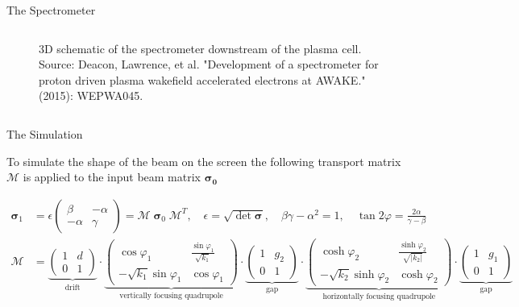 \documentclass[aspectratio=169]{beamer}
\begin{document}
\begin{frame}{The Spectrometer}
\begin{columns}
\begin{column}{0.5\linewidth}
\begin{figure}[h]
				\caption{
					3D schematic of the spectrometer downstream of the
					plasma cell. Source: Deacon, Lawrence, et al. "Development of a
					spectrometer for proton driven plasma wakefield accelerated
					electrons at AWAKE." (2015): WEPWA045.
				}
			\end{figure}
		\end{column}
	\end{columns}
\end{frame}

\small
\begin{frame}{The Simulation}

	To simulate the shape of the beam on the screen the following transport
	matrix $\mathcal{M}$ is applied to the input beam matrix $\bm{\sigma_0}$

	\begin{align*}
		\bm{\sigma}_1 &=
		\epsilon
		\begin{pmatrix}
			\beta & -\alpha \\
			-\alpha & \gamma
		\end{pmatrix} =
		\mathcal{M}\;\bm{\sigma}_0\;\mathcal{M}^T, \quad
		\epsilon = \sqrt{\det{\bm{\sigma}}}, \quad
		\beta\gamma-\alpha^2=1, \quad
		\tan2\varphi = \tfrac{2\alpha}{\gamma-\beta}
		\\[1em] %
		\mathcal{M} &= \underbrace{
		\begin{pmatrix}
			1 & d \\
			0 & 1
		\end{pmatrix}}_\text{drift}
		\cdot
		\underbrace{
		\begin{pmatrix}
			\cos\varphi_1 & \tfrac{\sin\varphi_1}{\sqrt{k_1}} \\
			-\sqrt{k_1}\sin\varphi_1 & \cos\varphi_1
		\end{pmatrix}}_\text{vertically focusing quadrupole}
		\cdot
		\underbrace{
		\begin{pmatrix}
			1 & g_2 \\
			0 & 1
		\end{pmatrix}}_\text{gap}
		\cdot
		\underbrace{
		\begin{pmatrix}
			\cosh\varphi_2 & \tfrac{\sinh\varphi_2}{\sqrt{|k_2|}} \\
			-\sqrt{k_2}\sinh\varphi_2 & \cosh\varphi_2
		\end{pmatrix}}_\text{horizontally focusing quadrupole}
		\cdot
		\underbrace{
		\begin{pmatrix}
			1 & g_1 \\
			0 & 1
		\end{pmatrix}}_\text{gap}
	\end{align*}
	\\[1em]


\end{frame}
\end{document}
